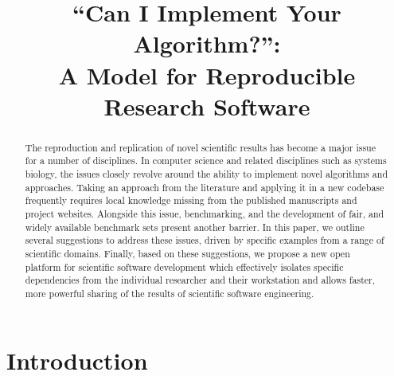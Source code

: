 \documentclass[10pt,conference,final]{IEEEtran}
\begin{document}

\title{``Can I Implement Your Algorithm?'':\\ A Model for Reproducible Research Software}

\author{
\and
{}
}

\maketitle

\begin{abstract}
The reproduction and replication of novel scientific results has
become a major issue for a number of disciplines. In computer science
and related disciplines such as systems biology, the issues closely
revolve around the ability to implement novel algorithms and
approaches. Taking an approach from the literature and applying it in
a new codebase frequently requires local knowledge missing from the
published manuscripts and project websites. Alongside this issue,
benchmarking, and the development of fair, and widely available
benchmark sets present another barrier. In this paper, we outline
several suggestions to address these issues, driven by specific
examples from a range of scientific domains.  Finally, based on these
suggestions, we propose a new open platform for scientific software
development which effectively isolates specific dependencies from the
individual researcher and their workstation and allows faster, more
powerful sharing of the results of scientific software engineering.
\end{abstract}

\IEEEpeerreviewmaketitle

\section{Introduction}
\end{document}
